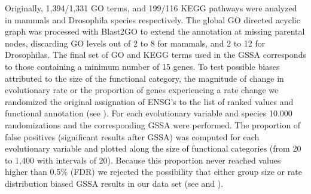 \begin{FPfigure}
\label{fig:gssa_met}
\end{FPfigure}

Originally, 1,394/1,331 GO terms, and 199/116 KEGG pathways were analyzed in mammals and Drosophila species respectively. The global GO directed acyclic graph was processed with Blast2GO \cite{Conesa2005} to extend the annotation at missing parental nodes, discarding GO levels out of 2 to 8 for mammals, and 2 to 12 for Drosophilas. The final set of GO and KEGG terms used in the GSSA corresponds to those containing a minimum number of 15 genes. To test possible biases attributed to the size of the functional category, the magnitude of change in evolutionary rate or the proportion of genes experiencing a rate change we randomized the original assignation of ENSG's to the list of ranked values and functional annotation (see ). For each evolutionary variable and species 10.000 randomizations and the corresponding GSSA were performed. The proportion of false positives (significant results after GSSA) was computed for each evolutionary variable and plotted along the size of functional categories (from 20 to 1,400 with intervals of 20). Because this proportion never reached values higher than 0.5\% (FDR) we rejected the possibility that either group size or rate distribution biased GSSA results in our data set (see  and ).

